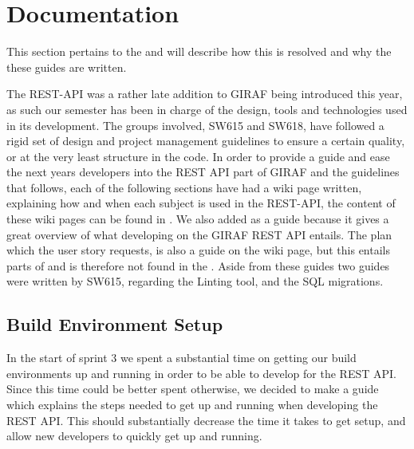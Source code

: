 \section{Documentation}
This section pertains to the  and will describe how this is resolved and why the these guides are written.

The REST-API was a rather late addition to GIRAF being introduced this year, as such our semester has been in charge of the design, tools and technologies used in its development.
The groups involved, SW615 and SW618, have followed a rigid set of design and project management guidelines to ensure a certain quality, or at the very least structure in the code.
In order to provide a guide and ease the next years developers into the REST API part of GIRAF and the guidelines that follows, each of the following sections have had a wiki page written, explaining how and when each subject is used in the REST-API, the content of these wiki pages can be found in .
We also added  as a guide because it gives a great overview of what developing on the GIRAF REST API entails.
The plan which the user story requests, is also a guide on the wiki page, but this entails parts of  and is therefore not found in the .
Aside from these guides two guides were written by SW615, regarding the Linting tool, and the SQL migrations.

\subsection{Build Environment Setup}
In the start of sprint 3 we spent a substantial time on getting our build environments up and running in order to be able to develop for the REST API.
Since this time could be better spent otherwise, we decided to make a guide which explains the steps needed to get up and running when developing the REST API.
This should substantially decrease the time it takes to get setup, and allow new developers to quickly get up and running.

